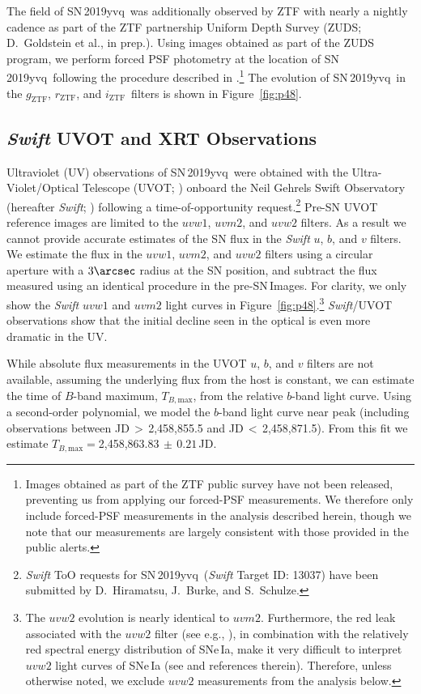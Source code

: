 \documentclass[twocolumn]{aastex63}
\newcommand{\rztf}{$r_\mathrm{ZTF}$}
\newcommand{\gztf}{$g_\mathrm{ZTF}$}
\newcommand{\iztf}{$i_\mathrm{ZTF}$}
\newcommand{\tbmax}{$T_{B,\mathrm{max}}$}
\newcommand{\sn}{SN\,2019yvq}
\begin{document}
The field of \sn\ was additionally observed by ZTF with nearly a nightly
cadence as part of the ZTF partnership Uniform Depth Survey (ZUDS;
D.~Goldstein et al., in prep.). Using images obtained as part of the ZUDS
program, we perform forced PSF photometry at the location of \sn\ following
the procedure described in \citet{Yao19}.\footnote{Images obtained as part of
the ZTF public survey have not been released, preventing us from applying our
forced-PSF measurements. We therefore only include forced-PSF measurements in
the analysis described herein, though we note that our measurements are
largely consistent with those provided in the public alerts.} The evolution
of \sn\ in the \gztf, \rztf, and \iztf\ filters is shown in
Figure~\ref{fig:p48}.

\subsection{\textit{Swift} UVOT and XRT Observations}\label{sec:swift}

Ultraviolet (UV) observations of \sn\ were obtained with the
Ultra-Violet/Optical Telescope (UVOT; \citealt{Roming05}) onboard the Neil
Gehrels Swift Observatory (hereafter \textit{Swift}; \citealt{Gehrels04})
following a time-of-opportunity request.\footnote{\textit{Swift} ToO requests
for \sn\ (\textit{Swift} Target ID: 13037) have been submitted by
D.~Hiramatsu, J.~Burke, and S.~Schulze.} Pre-SN UVOT reference images are
limited to the $uvw1$, $uvm2$, and $uvw2$ filters. As a result we cannot
provide accurate estimates of the SN flux in the \textit{Swift} $u$, $b$, and
$v$ filters. We estimate the flux in the $uvw1$, $uvm2$, and $uvw2$ filters
using a circular aperture with a $3\arcsec$ radius at the SN position, and
subtract the flux measured using an identical procedure in the pre-SN\,Images.
For clarity, we only show the \textit{Swift} $uvw1$ and $uvm2$ light curves in
Figure~\ref{fig:p48}.\footnote{The $uvw2$ evolution is nearly identical to
$uvm2$. Furthermore, the red leak associated with the $uvw2$ filter (see e.g.,
\citealt{Breeveld11}), in combination with the relatively red spectral energy
distribution of SNe\,Ia, make it very difficult to interpret $uvw2$ light
curves of SNe\,Ia (see \citealt{Brown17} and references therein). Therefore,
unless otherwise noted, we exclude $uvw2$ measurements from the analysis
below.} \textit{Swift}/UVOT observations show that the initial decline seen in
the optical is even more dramatic in the UV.

While absolute flux measurements in the UVOT $u$, $b$, and $v$ filters are
not available, assuming the underlying flux from the host is constant, we
can estimate the time of $B$-band maximum, \tbmax, from the relative
$b$-band light curve. Using a second-order polynomial, we model the $b$-band
light curve near peak (including observations between JD$\,> \,$2,458,855.5
and JD$\,<\,$2,458,871.5). From this fit we estimate \tbmax$ =
$2,458,863.83$ \,\pm \,0.21$\,JD.
\end{document}
